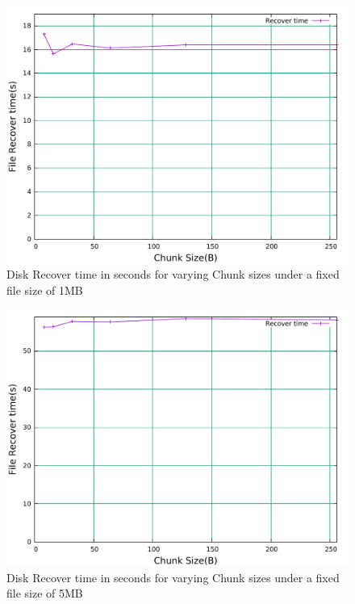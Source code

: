 \begin{figure}[h]
\includegraphics[width=\linewidth]{figures/RAIDRecoverTimeChuckSize1Mb.pdf}
\centering
\caption{Disk Recover time in seconds for varying Chunk sizes under a fixed file size of 1MB}
\label{fig:S3R6RcvCHK1MB}
\end{figure}

\begin{figure}[h]
\includegraphics[width=\linewidth]{figures/RAIDRecoverTimeChuckSize5Mb.pdf}
\centering
\caption{Disk Recover time in seconds for varying Chunk sizes under a fixed file size of 5MB}
\label{fig:S3R6RcvCHK5MB}
\end{figure}
